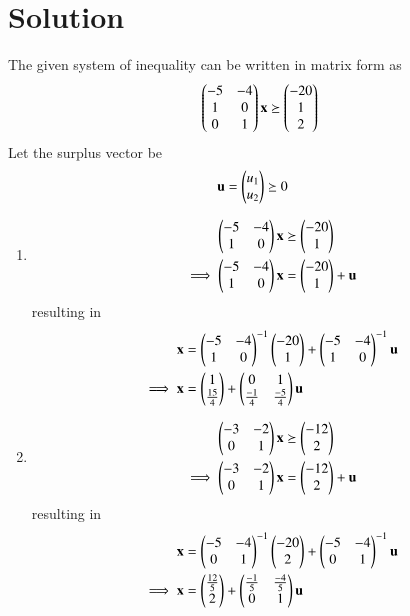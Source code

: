 \documentclass[journal,12pt,twocolumn]{IEEEtran}
\begin{document}
\section{Solution}
The given system of inequality can be written in matrix form as
\begin{align}
    \begin{pmatrix}-5 & -4 \\ 1 & 0 \\ 0 & 1\end{pmatrix}\mathbf{x} \succeq \begin{pmatrix}-20\\1\\2\end{pmatrix}
\end{align}
Let the surplus vector be
\begin{align}
    \mathbf{u} &= \begin{pmatrix}u_1\\u_2\end{pmatrix} \succeq 0
\end{align}
\begin{enumerate}
    \item 
    \begin{align}
        \begin{pmatrix}-5 & -4 \\ 1 & 0\end{pmatrix}\mathbf{x} &\succeq \begin{pmatrix}-20 \\ 1\end{pmatrix}
        \\
        \implies  \begin{pmatrix}-5 & -4 \\ 1 & 0\end{pmatrix}\mathbf{x} &= \begin{pmatrix}-20 \\ 1\end{pmatrix} + \mathbf{u}
    \end{align}
    resulting in 
    \begin{align}
        \mathbf{x} &= \begin{pmatrix}-5 & -4 \\1 & 0\end{pmatrix}^{-1}\begin{pmatrix}-20 \\ 1\end{pmatrix} + \begin{pmatrix}-5 & -4 \\1 & 0\end{pmatrix}^{-1}\mathbf{u}
        \\
        \implies \mathbf{x} &= \begin{pmatrix}1 \\\frac{15}{4}\end{pmatrix} + \begin{pmatrix}0 & 1\\ \frac{-1}{4} & \frac{-5}{4}\end{pmatrix}\mathbf{u}   \label{eq1}
    \end{align}
    \item 
    \begin{align}
        \begin{pmatrix}-3 & -2 \\ 0 & 1\end{pmatrix}\mathbf{x} &\succeq \begin{pmatrix}-12 \\ 2\end{pmatrix}
        \\
        \implies  \begin{pmatrix}-3 & -2 \\ 0 & 1\end{pmatrix}\mathbf{x} &= \begin{pmatrix}-12 \\ 2\end{pmatrix} + \mathbf{u}
    \end{align}
    resulting in 
    \begin{align}
        \mathbf{x} &= \begin{pmatrix}-5 & -4 \\0 & 1\end{pmatrix}^{-1}\begin{pmatrix}-20 \\ 2\end{pmatrix} + \begin{pmatrix}-5 & -4 \\0 & 1\end{pmatrix}^{-1}\mathbf{u}
        \\
        \implies \mathbf{x} &= \begin{pmatrix}\frac{12}{5} \\2\end{pmatrix} + \begin{pmatrix}\frac{-1}{5} & \frac{-4}{5}\\ 0 & 1\end{pmatrix}\mathbf{u} \label{eq2}
    \end{align}
\end{enumerate}
\end{document}
